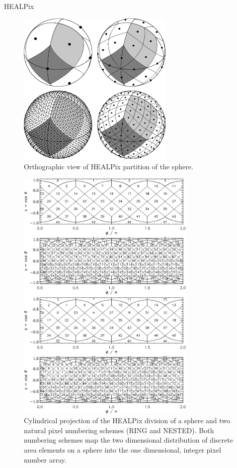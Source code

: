 HEALPix \cite{healpix}

\begin{figure}[!ht]
\begin{center}
\centerline{\includegraphics[height=7.5cm]{images/healpix4.pdf}}
\caption[Orthographic view of Healpix partition of the sphere]%
{\label{fig:healpix_sphere}%
Orthographic view of HEALPix partition of the sphere.}
\end{center}
\end{figure}

\begin{figure} [!ht]
\begin{center}
\centerline{\includegraphics[height=12.5cm]{images/healpix2d.pdf}}
\caption[Cylindrical projection]%
{\label{fig:healpix_numbering}%
Cylindrical projection of the HEALPix division of a
sphere and two natural pixel numbering schemes (RING and NESTED). 
Both numbering schemes map the two dimensional 
distribution
of discrete area elements on a sphere into the one dimensional, 
integer pixel number array.
}
\end{center}
\end{figure}